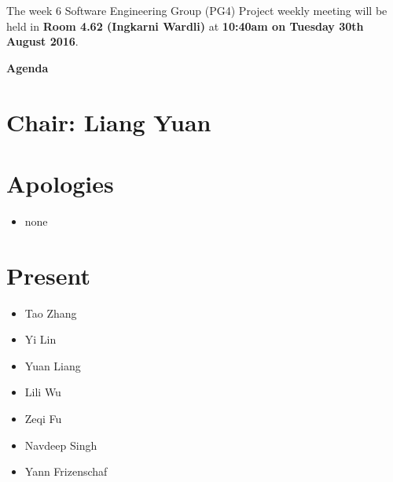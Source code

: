 \documentclass[11pt, a4paper]{article}
\begin{document}

\noindent The week 6 Software Engineering Group (PG4) Project weekly meeting will be held in {\bf Room 4.62 (Ingkarni Wardli)} at {\bf 10:40am on Tuesday 30th August 2016}.



\vspace*{15pt}

\begin{center}

\huge \bf Agenda

\end{center}




\section*{Chair: Liang Yuan}

\vspace*{10pt}




\section{Apologies}

\begin{itemize}

\item none

\end{itemize}




\section{Present}

\begin{itemize}

\item Tao Zhang

\item Yi Lin

\item Yuan Liang

\item Lili Wu

\item Zeqi Fu

\item Navdeep Singh

\item Yann Frizenschaf

\end{itemize}
\end{document}
